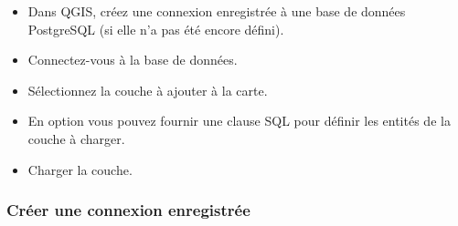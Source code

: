 \begin{itemize}
\item Dans QGIS, créez une connexion enregistrée à une base de données PostgreSQL (si elle n'a pas été encore défini).
\item Connectez-vous à la base de données.
\item Sélectionnez la couche à ajouter à la carte.
\item En option vous pouvez fournir une clause SQL  pour définir les entités de la couche à charger.
\item Charger la couche.
\end{itemize}

\subsubsection{Créer une connexion enregistrée}\label{sec:postgis_stored}

